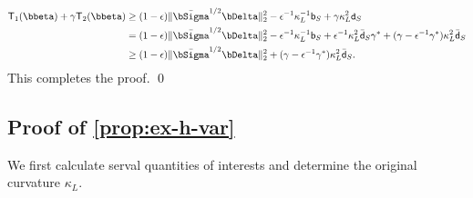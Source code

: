 \documentclass[10pt]{article}
\numberwithin{equation}{section}
\begin{document}
\begin{align}
\label{eq:thm1-proof-decomp}
	\mathsf{T}_1(\bbeta) + \gamma \mathsf{T}_2(\bbeta) &\ge (1 - \epsilon) \|\bar{\bSigma}^{1/2}\bDelta\|_2^2 - \epsilon^{-1} \kappa_L^{-1} \mathsf{b}_S + \gamma \kappa_L^2 \mathtt{d}_{S} \\
	&= (1-\epsilon) \|\bar{\bSigma}^{1/2}\bDelta\|_2^2 - \epsilon^{-1} \kappa_L^{-1} \mathsf{b}_S + \epsilon^{-1} \kappa_L^2 \bar{\mathsf{d}}_S \gamma^* +  (\gamma - \epsilon^{-1} \gamma^*) \kappa_L^2 \bar{\mathsf{d}}_S \nonumber \\
	&\ge (1-\epsilon) \|\bar{\bSigma}^{1/2}\bDelta\|_2^2 + (\gamma - \epsilon^{-1} \gamma^*) \kappa_L^2 \bar{\mathsf{d}}_S. \nonumber
\end{align} This completes the proof. \qed

\subsection{Proof of \cref{prop:ex-h-var}}

We first calculate serval quantities of interests and determine the original curvature $\kappa_L$.
\end{document}
